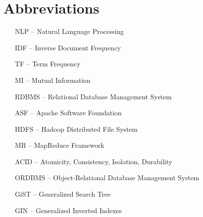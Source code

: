 \section*{Abbreviations}

\begin{itemize}[leftmargin=2cm, topsep=0pt, partopsep=5pt,itemsep=0pt,parsep=0pt]
\item[NLP --] Natural Language Processing
\item[IDF --] Inverse Document Frequency
\item[TF --] Term Frequency
\item[MI --] Mutual Information
\item[RDBMS --] Relational Database Management System
\item[ASF --] Apache Software Foundation 
\item [HDFS --] Hadoop Distributed File System
\item [MR --] MapReduce Framework
\item [ACID --] Atomicity, Consistency, Isolation, Durability
\item [ORDBMS --] Object-Relational Database Management System
\item [GiST --] Generalized Search Tree
\item [GIN --] Generalized Inverted Indexes

\end{itemize}